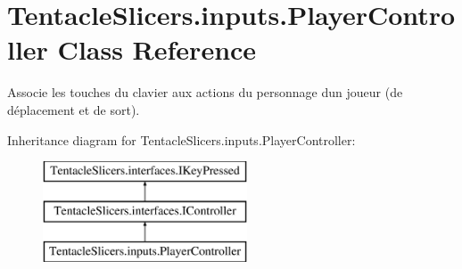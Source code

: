 \hypertarget{class_tentacle_slicers_1_1inputs_1_1_player_controller}{}\section{Tentacle\+Slicers.\+inputs.\+Player\+Controller Class Reference}
\label{class_tentacle_slicers_1_1inputs_1_1_player_controller}


Associe les touches du clavier aux actions du personnage d\textquotesingle{}un joueur (de déplacement et de sort).  


Inheritance diagram for Tentacle\+Slicers.\+inputs.\+Player\+Controller\+:\begin{figure}[H]
\begin{center}
\leavevmode
\includegraphics[height=3.000000cm]{class_tentacle_slicers_1_1inputs_1_1_player_controller}
\end{center}
\end{figure}
